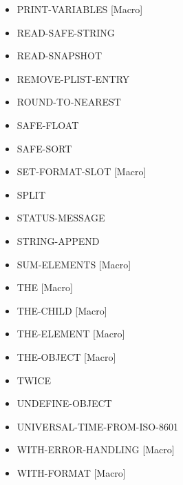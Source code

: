 \documentclass [11pt]{book}
\begin{document}
\begin{itemize}
\item {}PRINT-VARIABLES [Macro]

\item {}READ-SAFE-STRING

\item {}READ-SNAPSHOT

\item {}REMOVE-PLIST-ENTRY

\item {}ROUND-TO-NEAREST

\item {}SAFE-FLOAT

\item {}SAFE-SORT

\item {}SET-FORMAT-SLOT [Macro]

\item {}SPLIT

\item {}STATUS-MESSAGE

\item {}STRING-APPEND

\item {}SUM-ELEMENTS [Macro]

\item {}THE [Macro]

\item {}THE-CHILD [Macro]

\item {}THE-ELEMENT [Macro]

\item {}THE-OBJECT [Macro]

\item {}TWICE

\item {}UNDEFINE-OBJECT

\item {}UNIVERSAL-TIME-FROM-ISO-8601

\item {}WITH-ERROR-HANDLING [Macro]

\item {}WITH-FORMAT [Macro]


\end{itemize}
\end{document}
